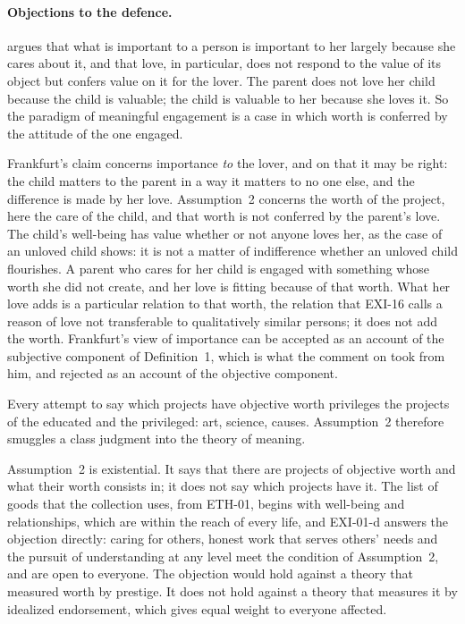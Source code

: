 \paragraph{Objections to the defence.}

\begin{objection}[Frankfurt]\label{o:frankfurt}
\citet{Frankfurt1982,Frankfurt2004} argues that what is important to a person is important to her largely because she cares about it, and that love, in particular, does not respond to the value of its object but confers value on it for the lover. The parent does not love her child because the child is valuable; the child is valuable to her because she loves it. So the paradigm of meaningful engagement is a case in which worth is conferred by the attitude of the one engaged.
\end{objection}

\begin{reply}
Frankfurt's claim concerns importance \emph{to} the lover, and on that it may be right: the child matters to the parent in a way it matters to no one else, and the difference is made by her love. Assumption~2 concerns the worth of the project, here the care of the child, and that worth is not conferred by the parent's love. The child's well-being has value whether or not anyone loves her, as the case of an unloved child shows: it is not a matter of indifference whether an unloved child flourishes. A parent who cares for her child is engaged with something whose worth she did not create, and her love is fitting because of that worth. What her love adds is a particular relation to that worth, the relation that EXI-16 calls a reason of love not transferable to qualitatively similar persons; it does not add the worth. Frankfurt's view of importance can be accepted as an account of the subjective component of Definition~1, which is what the comment on  took from him, and rejected as an account of the objective component.
\end{reply}

\begin{objection}[Elitism]\label{o:elitism}
Every attempt to say which projects have objective worth privileges the projects of the educated and the privileged: art, science, causes. Assumption~2 therefore smuggles a class judgment into the theory of meaning.
\end{objection}

\begin{reply}
Assumption~2 is existential. It says that there are projects of objective worth and what their worth consists in; it does not say which projects have it. The list of goods that the collection uses, from ETH-01, begins with well-being and relationships, which are within the reach of every life, and EXI-01-d answers the objection directly: caring for others, honest work that serves others' needs and the pursuit of understanding at any level meet the condition of Assumption~2, and are open to everyone. The objection would hold against a theory that measured worth by prestige. It does not hold against a theory that measures it by idealized endorsement, which gives equal weight to everyone affected.
\end{reply}

